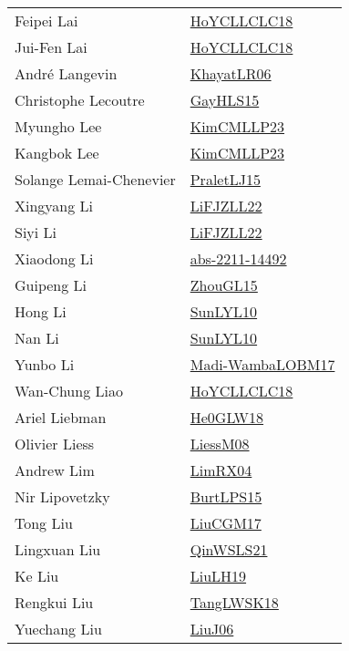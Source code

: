 {\begin{longtable}{p{4cm}p{20cm}}
Feipei Lai & \href{}{HoYCLLCLC18}\cite{HoYCLLCLC18} \\
Jui{-}Fen Lai & \href{}{HoYCLLCLC18}\cite{HoYCLLCLC18} \\
Andr{\'{e}} Langevin & \href{articles/KhayatLR06.pdf}{KhayatLR06}\cite{KhayatLR06} \\
Christophe Lecoutre & \href{papers/GayHLS15.pdf}{GayHLS15}\cite{GayHLS15} \\
Myungho Lee & \href{papers/KimCMLLP23.pdf}{KimCMLLP23}\cite{KimCMLLP23} \\
Kangbok Lee & \href{papers/KimCMLLP23.pdf}{KimCMLLP23}\cite{KimCMLLP23} \\
Solange Lemai{-}Chenevier & \href{papers/PraletLJ15.pdf}{PraletLJ15}\cite{PraletLJ15} \\
Xingyang Li & \href{papers/LiFJZLL22.pdf}{LiFJZLL22}\cite{LiFJZLL22} \\
Siyi Li & \href{papers/LiFJZLL22.pdf}{LiFJZLL22}\cite{LiFJZLL22} \\
Xiaodong Li & \href{articles/abs-2211-14492.pdf}{abs-2211-14492}\cite{abs-2211-14492} \\
Guipeng Li & \href{papers/ZhouGL15.pdf}{ZhouGL15}\cite{ZhouGL15} \\
Hong Li & \href{papers/SunLYL10.pdf}{SunLYL10}\cite{SunLYL10} \\
Nan Li & \href{papers/SunLYL10.pdf}{SunLYL10}\cite{SunLYL10} \\
Yunbo Li & \href{papers/Madi-WambaLOBM17.pdf}{Madi-WambaLOBM17}\cite{Madi-WambaLOBM17} \\
Wan{-}Chung Liao & \href{}{HoYCLLCLC18}\cite{HoYCLLCLC18} \\
Ariel Liebman & \href{papers/He0GLW18.pdf}{He0GLW18}\cite{He0GLW18} \\
Olivier Liess & \href{articles/LiessM08.pdf}{LiessM08}\cite{LiessM08} \\
Andrew Lim & \href{papers/LimRX04.pdf}{LimRX04}\cite{LimRX04} \\
Nir Lipovetzky & \href{papers/BurtLPS15.pdf}{BurtLPS15}\cite{BurtLPS15} \\
Tong Liu & \href{papers/LiuCGM17.pdf}{LiuCGM17}\cite{LiuCGM17} \\
Lingxuan Liu & \href{articles/QinWSLS21.pdf}{QinWSLS21}\cite{QinWSLS21} \\
Ke Liu & \href{papers/LiuLH19.pdf}{LiuLH19}\cite{LiuLH19} \\
Rengkui Liu & \href{}{TangLWSK18}\cite{TangLWSK18} \\
Yuechang Liu & \href{papers/LiuJ06.pdf}{LiuJ06}\cite{LiuJ06} \\

\end{longtable}}
